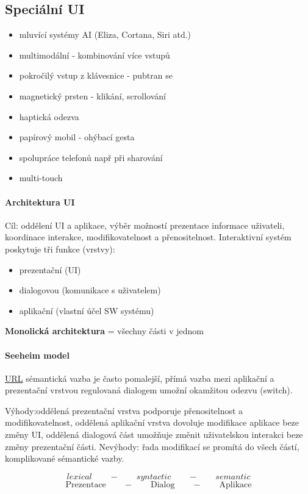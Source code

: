 \subsection{Speciální UI}
\begin{itemize}[itemsep=0px]
\item mluvící systémy AI (Eliza, Cortana, Siri atd.)
\item multimodální - kombinování více vstupů
\item pokročilý vstup z klávesnice - pubtran se 
\item magnetický prsten - klikání, scrollování
\item haptická odezva
\item papírový mobil - ohýbací gesta
\item spolupráce telefonů např při sharování
\item multi-touch
\end{itemize}


\paragraph{Architektura UI}
Cíl: oddělení UI a aplikace, výběr možností prezentace informace uživateli, koordinace interakce, modifikovatelnost a přenositelnost. Interaktivní systém poskytuje tři funkce (vrstvy):
\begin{itemize}[itemsep=0px]
\item prezentační (UI)
\item dialogovou (komunikace s uživatelem)
\item aplikační (vlastní účel SW systému)
\end{itemize}
\textbf{Monolická architektura} = všechny části v jednom

\paragraph{Seeheim model}
\href{http://centurion2.com/SEHomework/UserInterfaceDesign/UserInterfaceDesign.php#SeeheimModel}{URL}
sémantická vazba je často pomalejší, přímá vazba mezi aplikační a prezentační vrstvou regulovaná dialogem umožní okamžitou odezvu (switch).

Výhody:oddělená prezentační vrstva podporuje přenositelnost a modifikovatelnost, oddělená aplikační vrstva dovoluje modifikace aplikace beze změny UI, oddělená dialogová část umožňuje změnit uživatelskou interakci beze změny prezentační části.
Nevýhody: řada modifikací se promítá do všech částí, komplikované sémantické vazby.

$$lexical \qquad - \qquad syntactic \qquad - \qquad semantic$$
$$\text{Prezentace} \qquad - \qquad \text{Dialog} \qquad - \qquad \text{Aplikace}$$